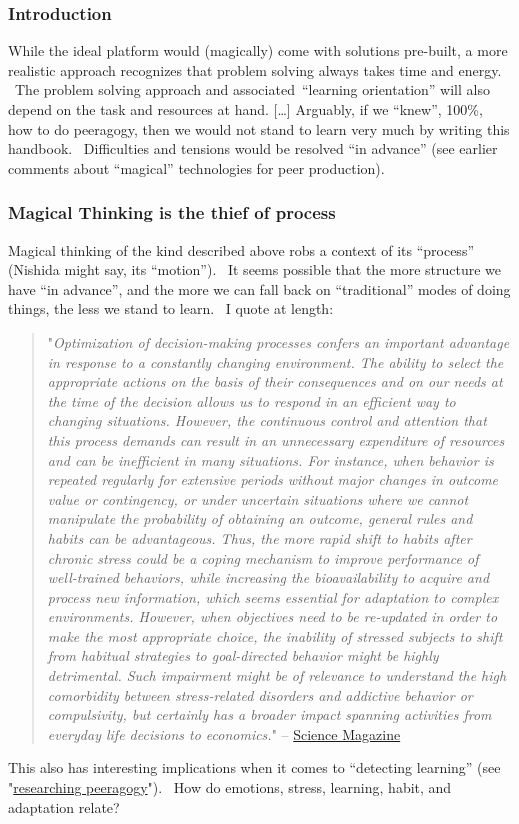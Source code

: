 \subsubsection{Introduction}

While the ideal platform would (magically) come with solutions
pre-built, a more realistic approach recognizes that problem solving
always takes time and energy. ~The problem solving approach and
associated~``learning orientation'' will also depend on the task and
resources at hand. {[}\ldots{}{]} Arguably, if we ``knew'', 100\%, how
to do peeragogy, then we would not stand to learn very much by writing
this handbook.~ Difficulties and tensions would be resolved ``in
advance'' (see earlier comments about ``magical'' technologies for peer
production).

\subsubsection{Magical Thinking is the thief of process}

Magical thinking of the kind described above robs a context of its
``process'' (Nishida might say, its ``motion'').~ It seems possible that
the more structure we have ``in advance'', and the more we can fall back
on ``traditional'' modes of doing things, the less we stand to learn.~ I
quote at length:

\begin{quote}
"\emph{Optimization of decision-making processes confers an important
advantage in response to a constantly changing environment. The ability
to select the appropriate actions on the basis of their consequences and
on our needs at the time of the decision allows us to respond in an
efficient way to changing situations. However, the continuous control
and attention that this process demands can result in an unnecessary
expenditure of resources and can be inefficient in many situations. For
instance, when behavior is repeated regularly for extensive periods
without major changes in outcome value or contingency, or under
uncertain situations where we cannot manipulate the probability of
obtaining an outcome, general rules and habits can be advantageous.
Thus, the more rapid shift to habits after chronic stress could be a
coping mechanism to improve performance of well-trained behaviors, while
increasing the bioavailability to acquire and process new information,
which seems essential for adaptation to complex environments. However,
when objectives need to be re-updated in order to make the most
appropriate choice, the inability of stressed subjects to shift from
habitual strategies to goal-directed behavior might be highly
detrimental. Such impairment might be of relevance to understand the
high comorbidity between stress-related disorders and addictive behavior
or compulsivity, but certainly has a broader impact spanning activities
from everyday life decisions to economics.}" --
\href{http://www.sciencemag.org/content/325/5940/621.full}{Science
Magazine}
\end{quote}

This also has interesting implications when it comes to ``detecting
learning'' (see
"\href{http://peeragogy.org/to-peeragogy/researching-peeragogy/}{researching
peeragogy}").~ How do emotions, stress, learning, habit, and adaptation
relate?
